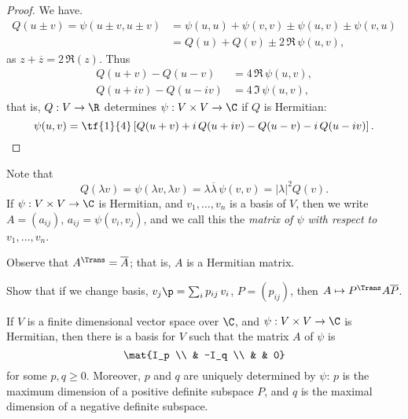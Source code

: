 \begin{proof}
	We have.
	\begin{align*}
		Q(u\pm v) = \psi(u\pm v,u\pm v) %
		&= \psi(u,u) + \psi(v,v) \pm \psi(u,v) \pm \psi(v,u) \\
		&= Q(u) + Q(v) \pm 2\,\Re\,\psi(u,v),
	\end{align*}
	as $z+\overline{z}=2\,\Re(z)$. Thus
	\begin{align*}
		Q(u+v) - Q(u-v) &= 4\,\Re\,\psi(u,v), \\
		Q(u+iv) - Q(u-iv) &= 4\,\Im\,\psi(u,v),
	\end{align*}
	that is, $Q:V\to\R$ determines $\psi:V\times V\to\C$ if $Q$ is Hermitian:
	\begin{equation*}
		\psi(u,v) = \tf{1}{4}\left[ Q(u+v) + i\,Q(u+iv) - Q(u-v) - i\,Q(u-iv) \right]. \qedhere %
	\end{equation*}
\end{proof}

Note that
\begin{equation*}
	Q(\lambda v)
	= \psi(\lambda v,\lambda v)
	= \lambda\overline{\lambda}\,\psi(v,v)
	= \left\vert \lambda \right\vert^2 Q(v). %
\end{equation*}
If $\psi:V\times V\to\C$ is Hermitian, and $v_1,\ldots,v_n$ is a basis of $V$, then we write $A=(a_{ij})$, $a_{ij}=\psi(v_i,v_j)$, and we call this the \emph{matrix of $\psi$ with respect to $v_1,\ldots,v_n$}.

Observe that $A^\Trans=\overline{A}$; that is, $A$ is a Hermitian matrix.

\begin{exercise}
	Show that if we change basis, $v_j\p = \sum_i p_{ij} \, v_i$, $P=(p_{ij})$, then $A\mapsto P^\Trans A\overline{P}$. %
\end{exercise}

\begin{theorem}
	If $V$ is a finite dimensional vector space over $\C$, and $\psi:V\times V\to\C$ is Hermitian, then there is a basis for $V$ such that the matrix $A$ of $\psi$ is %
	\begin{equation*}
		\mat{I_p \\ & -I_q \\ & & 0}
	\end{equation*}
	for some $p,q\geq 0$. Moreover, $p$ and $q$ are uniquely determined by $\psi$: $p$ is the maximum dimension of a positive definite subspace $P$, and $q$ is the maximal dimension  of a negative definite subspace. %
\end{theorem}

